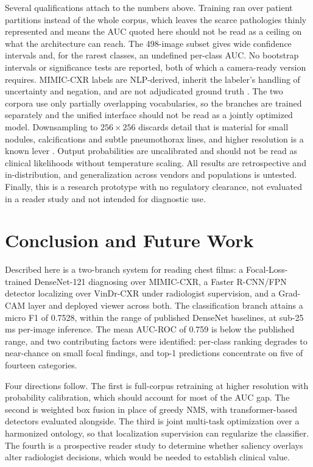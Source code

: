 \documentclass[conference]{IEEEtran}
\begin{document}
Several qualifications attach to the numbers above. Training ran over patient
partitions instead of the whole corpus, which leaves the scarce pathologies
thinly represented and means the AUC quoted here should not be read as a
ceiling on what the architecture can reach. The 498-image subset gives wide confidence intervals and,
for the rarest classes, an undefined per-class AUC. No bootstrap intervals or
significance tests are reported, both of which a camera-ready version requires. MIMIC-CXR labels are NLP-derived, inherit the labeler's handling of uncertainty
and negation, and are not adjudicated ground truth
\cite{majkowska2020}. The two corpora use only partially overlapping
vocabularies, so the branches are trained separately and the unified interface
should not be read as a jointly optimized model. Downsampling to $256 \times
256$ discards detail that is material for small nodules, calcifications and
subtle pneumothorax lines, and higher resolution is a known lever
\cite{baltruschat2019}. Output probabilities are uncalibrated and should not be
read as clinical likelihoods without temperature scaling. All results are
retrospective and in-distribution, and generalization across vendors and
populations is untested. Finally, this is a research prototype with no
regulatory clearance, not evaluated in a reader study and not intended for
diagnostic use.

\section{Conclusion and Future Work}

Described here is a two-branch system for reading chest films: a
Focal-Loss-trained DenseNet-121 diagnosing over MIMIC-CXR, a Faster R-CNN/FPN
detector localizing over VinDr-CXR under radiologist supervision, and a Grad-CAM
layer and deployed viewer across both. The classification branch attains a micro F1 of 0.7528, within the
range of published DenseNet baselines, at sub-25\,ms per-image inference. The
mean AUC-ROC of 0.759 is below the published range, and two contributing
factors were identified: per-class ranking degrades to near-chance
on small focal findings, and top-1 predictions concentrate on five of fourteen
categories.

Four directions follow. The first is full-corpus retraining at higher
resolution with probability calibration, which should account for most of the
AUC gap. The second is weighted box fusion \cite{solovyev2021}
in place of greedy NMS, with transformer-based detectors evaluated alongside.
The third is joint multi-task optimization over a harmonized ontology, so that
localization supervision can regularize the classifier. The fourth is a
prospective reader study to determine whether saliency overlays alter
radiologist decisions, which would be needed to establish clinical value.
\end{document}
